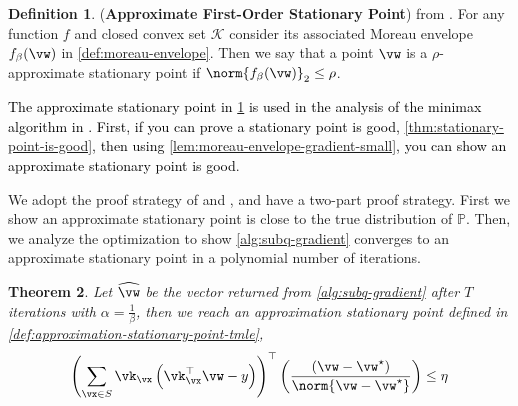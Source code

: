 \documentclass{article} %
\theoremstyle{plain}
\newtheorem{thm}{Theorem}
\theoremstyle{definition}
\newtheorem{definition}[thm]{Definition}
\theoremstyle{remark}
\newcommand{\ccref}[1]{\textcolor{black}{\cref{#1}}}
\begin{document}
	\begin{definition}
		\label{def:approximate-stationary-point}
		(\textbf{Approximate First-Order Stationary Point}) from \citep{cheng:2020}. For any function $f$ and closed convex set $\mathcal{K}$ consider its associated Moreau envelope $f_\beta(\vw)$ in \ccref{def:moreau-envelope}. Then we say that a point $\vw$ is a $\rho$-approximate stationary point if $\norm{f_\beta(\vw)}_2 \leq \rho$.
	\end{definition}
	\textcolor{black}{The approximate stationary point in \ccref{def:approximate-stationary-point} is used in the analysis of the minimax algorithm in \citep{cheng:2020}. First, if you can prove a stationary point is good, \ccref{thm:stationary-point-is-good}, then using \ccref{lem:moreau-envelope-gradient-small}, you can show an approximate stationary point is good}.
	
	\iffalse
	\begin{definition}
		\label{def:approximate-stationary-point-tmle}
		(\textbf{Approximate First-Order Stationary Point}) from \citep{awasthi:2022}. A regression coefficients vector, $\vw$ is an approximate stationary point if:
		\begin{equation}
			\left(\sum_{\vx \in S} \vk_{\vx}\left(\vk_{\vx}^\top \vw - y\right)\right)^\top\left(\frac{\left(\vw - \vw^{\star}\right)}{\norm{\vw-\vw^{\star}}}\right) \leq \eta
		\end{equation}
	\end{definition}
	\fi
	
	We adopt the proof strategy of \citep{awasthi:2022} and \citep{cheng:2020}, and have a two-part proof strategy. First we show an approximate stationary point is close to the true distribution of $\mathbb{P}$. Then, we analyze the optimization to show \ccref{alg:subq-gradient} converges to an approximate stationary point in a polynomial number of iterations. 
	
	\iffalse
	\begin{thm}
		\label{thm:stationary-point}
		Let $\widehat{\vw}$ be the vector returned from \ccref{alg:subq-gradient} after $T$ iterations with $\alpha = \frac{1}{\beta}$, then we reach an approximation stationary point defined in \ccref{def:approximation-stationary-point-tmle}, 
		\begin{equation}
			\left(\sum_{\vx \in S} \vk_{\vx}\left(\vk_{\vx}^\top \vw - y\right)\right)^\top\left(\frac{\left(\vw - \vw^{\star}\right)}{\norm{\vw-\vw^{\star}}}\right) \leq \eta
		\end{equation}
	\end{thm}
	
\end{document}
